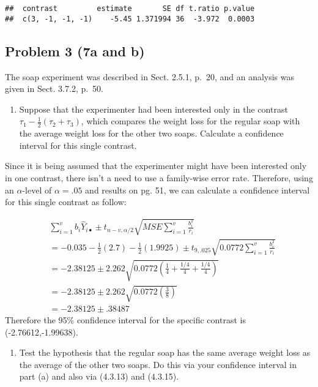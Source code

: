 \documentclass[12pt,]{article}
\providecommand{\tightlist}{%
  \setlength{\itemsep}{0pt}\setlength{\parskip}{0pt}}
\begin{document}
\begin{verbatim}
##  contrast         estimate       SE df t.ratio p.value
##  c(3, -1, -1, -1)    -5.45 1.371994 36  -3.972  0.0003
\end{verbatim}

\subsection{Problem 3 (7a and b)}\label{problem-3-7a-and-b}

The soap experiment was described in Sect. 2.5.1, p.~20, and an analysis
was given in Sect. 3.7.2, p.~50.

\begin{enumerate}
\def\labelenumi{(\alph{enumi})}
\tightlist
\item
  Suppose that the experimenter had been interested only in the contrast
  \(\tau_1 - \frac{1}{2}(\tau_2 + \tau_3)\), which compares the weight
  loss for the regular soap with the average weight loss for the other
  two soaps. Calculate a confidence interval for this single contrast.
\end{enumerate}

Since it is being assumed that the experimenter might have been
interested only in one contrast, there isn't a need to use a family-wise
error rate. Therefore, using an \(\alpha\)-level of \(\alpha=.05\) and
results on pg. 51, we can calculate a confidence interval for this
single contrast as follow:

\[
\begin{aligned}
& \sum_{i=1}^v b_i\hat{Y}_{i\bullet} \pm t_{n-v,\alpha/2} \sqrt{MSE \sum_{i=1}^v \frac{b_i^2}{r_i}}\\
&= -0.035- \frac{1}{2}(2.7) - \frac{1}{2}(1.9925) \pm t_{9,.025}
 \sqrt{0.0772 \sum_{i=1}^v \frac{b_i^2}{r_i}}\\
&= -2.38125 \pm 2.262\sqrt{0.0772 \left( \frac{1}{4} + \frac{1/4}{4} + \frac{1/4}{4} \right)}\\
&= -2.38125 \pm 2.262\sqrt{0.0772 \left( \frac{3}{8}  \right)}\\
&= -2.38125 \pm .38487
\end{aligned}
\] Therefore the 95\% confidence interval for the specific contrast is
(-2.76612,-1.99638).

\begin{enumerate}
\def\labelenumi{(\alph{enumi})}
\setcounter{enumi}{1}
\tightlist
\item
  Test the hypothesis that the regular soap has the same average weight
  loss as the average of the other two soaps. Do this via your
  confidence interval in part (a) and also via (4.3.13) and (4.3.15).
\end{enumerate}
\end{document}
